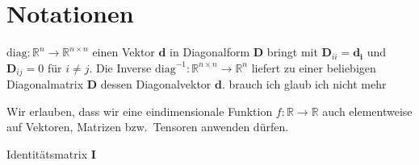 \section{Notationen}

$\text{diag} \colon \mathbb{R}^n \to \mathbb{R}^{n \times n}$ einen Vektor $\mathbf{d}$ in Diagonalform $\mathbf{D}$ bringt mit $\mathbf{D}_{ii} = \mathbf{d_i}$ und $\mathbf{D}_{ij} = 0$ für $i \neq j$.
Die Inverse $\text{diag}^{-1} \colon \mathbb{R}^{n \times n} \to \mathbb{R}^n$ liefert zu einer beliebigen Diagonalmatrix $\mathbf{D}$ dessen Diagonalvektor $\mathbf{d}$.
brauch ich glaub ich nicht mehr

Wir erlauben, dass wir eine eindimensionale Funktion $f \colon \mathbb{R} \to \mathbb{R}$ auch elementweise auf Vektoren, Matrizen bzw.\ Tensoren anwenden dürfen.

Identitätsmatrix $\mathbf{I}$
